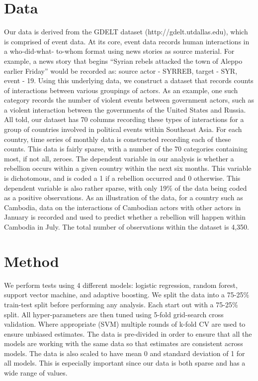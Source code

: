\documentclass[12pt, letterpaper]{article}
\begin{document}
\section*{Data}
Our data is derived from the GDELT dataset (http://gdelt.utdallas.edu), which is comprised of event data. At its core, event data records human interactions in a who-did-what- to-whom format using news stories as source material. For example, a news story that begins ``Syrian rebels attacked the town of Aleppo earlier Friday'' would be recorded as: source actor - SYRREB, target - SYR, event - 19. Using this underlying data, we construct a dataset that records counts of interactions between various groupings of actors. As an example, one such category records the number of violent events between government actors, such as a violent interaction between the governments of the United States and Russia. All told, our dataset has 70 columns recording these types of interactions for a group of countries involved in political events within Southeast Asia. For each country, time series of monthly data is constructed recording each of these counts. This data is fairly sparse, with a number of the 70 categories containing most, if not all, zeroes. The dependent variable in our analysis is whether a rebellion occurs within a given country within the next six months. This variable is dichotomous, and is coded a 1 if a rebellion occurred and 0 otherwise. This dependent variable is also rather sparse, with only 19\% of the data being coded as a positive observations. As an illustration of the data, for a country such as Cambodia, data on the interactions of Cambodian actors with other actors in January is recorded and used to predict whether a rebellion will happen within Cambodia in July. The total number of observations within the dataset is 4,350. \\

\section*{Method}

We perform tests using 4 different models: logistic regression, random forest, support vector machine, and adaptive 
boosting. We split the data into a 75-25\% train-test split before performing any analysis. Each start out with a 75-25\% 
split. All hyper-parameters are then tuned using 5-fold grid-search cross validation. Where appropriate (SVM) multiple 
rounds of k-fold CV are used to ensure unbiased estimates. The data is pre-divided in order to ensure that all the models 
are working with the same data so that estimates are consistent across models. The data is also scaled to have mean 0 and 
standard deviation of 1 for all models. This is especially important since our data is both sparse and has a wide range of 
values. \\
\end{document}
